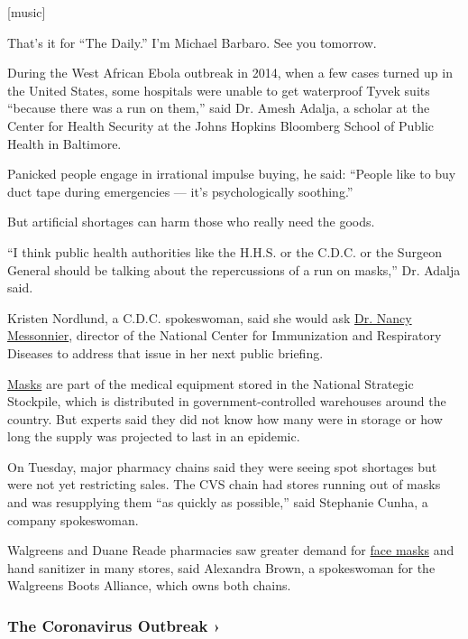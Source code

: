 {[}music{]}

That's it for ``The Daily.'' I'm Michael Barbaro. See you tomorrow.

During the West African Ebola outbreak in 2014, when a few cases turned
up in the United States, some hospitals were unable to get waterproof
Tyvek suits ``because there was a run on them,'' said Dr. Amesh Adalja,
a scholar at the Center for Health Security at the Johns Hopkins
Bloomberg School of Public Health in Baltimore.

Panicked people engage in irrational impulse buying, he said: ``People
like to buy duct tape during emergencies --- it's psychologically
soothing.''

But artificial shortages can harm those who really need the goods.

``I think public health authorities like the H.H.S. or the C.D.C. or the
Surgeon General should be talking about the repercussions of a run on
masks,'' Dr. Adalja said.

Kristen Nordlund, a C.D.C. spokeswoman, said she would ask
\href{https://www.cdc.gov/about/leadership/leaders/ncird.html}{Dr. Nancy
Messonnier}, director of the National Center for Immunization and
Respiratory Diseases to address that issue in her next public briefing.

\href{https://www.nytimes3xbfgragh.onion/2020/03/22/business/coronavirus-n95-masks-target.html}{Masks}
are part of the medical equipment stored in the National Strategic
Stockpile, which is distributed in government-controlled warehouses
around the country. But experts said they did not know how many were in
storage or how long the supply was projected to last in an epidemic.

On Tuesday, major pharmacy chains said they were seeing spot shortages
but were not yet restricting sales. The CVS chain had stores running out
of masks and was resupplying them ``as quickly as possible,'' said
Stephanie Cunha, a company spokeswoman.

Walgreens and Duane Reade pharmacies saw greater demand for
\href{https://www.nytimes3xbfgragh.onion/2020/02/29/health/coronavirus-n95-face-masks.html}{face
masks} and hand sanitizer in many stores, said Alexandra Brown, a
spokeswoman for the Walgreens Boots Alliance, which owns both chains.

\href{https://www.nytimes3xbfgragh.onion/news-event/coronavirus?action=click\&pgtype=Article\&state=default\&region=MAIN_CONTENT_3\&context=storylines_faq}{}

\hypertarget{the-coronavirus-outbreak-}{%
\subsubsection{The Coronavirus Outbreak
›}\label{the-coronavirus-outbreak-}}

